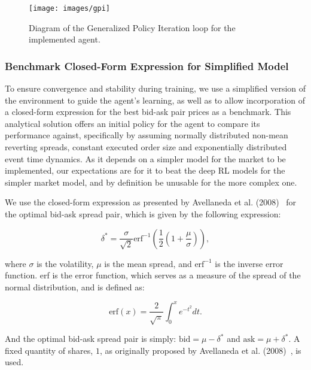 \begin{figure}[H]
    \centering
    \texttt{[image: images/gpi]}
    \caption{Diagram of the Generalized Policy Iteration loop for the implemented agent.}
    \label{fig:gpi}
\end{figure}

\subsubsection{Benchmark Closed-Form Expression for Simplified Model}
To ensure convergence and stability during training, we use a simplified version of the environment to guide the agent's learning,
as well as to allow incorporation of a closed-form expression for the best bid-ask pair prices as a benchmark.
This analytical solution offers an initial policy for the agent to compare its performance against,
specifically by assuming normally distributed non-mean reverting spreads, constant executed order size and exponentially distributed event time dynamics.
As it depends on a simpler model for the market to be implemented, our expectations are for it to beat the deep RL models for the simpler market model,
and by definition be unusable for the more complex one.

We use the closed-form expression as presented by Avellaneda et al. (2008)~\cite{Avellaneda2008} for the optimal bid-ask spread pair,
which is given by the following expression:

\[
    \delta^* = \frac{\sigma}{\sqrt{2}} \text{erf}^{-1} \left( \frac{1}{2} \left( 1 + \frac{\mu}{\sigma} \right) \right),
\]

where $\sigma$ is the volatility, $\mu$ is the mean spread, and $\text{erf}^{-1}$ is the inverse error function.
erf is the error function, which serves as a measure of the spread of the normal distribution, and is defined as:

\[
    \text{erf}(x) = \frac{2}{\sqrt{\pi}} \int_{0}^{x} e^{-t^2} dt.
\]

And the optimal bid-ask spread pair is simply: $\text{bid} = \mu - \delta^*$ and $\text{ask} = \mu + \delta^*$.
A fixed quantity of shares, $1$, as originally proposed by Avellaneda et al. (2008)~\cite{Avellaneda2008}, is used.

